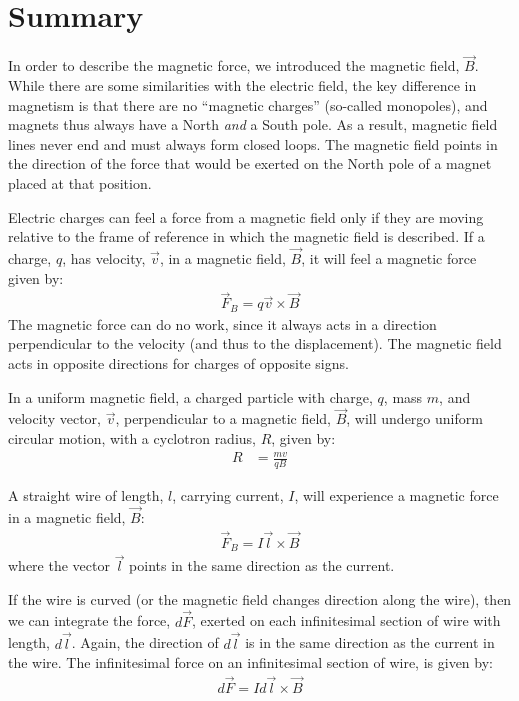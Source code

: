 \newpage
\section{Summary}
\begin{chapterSummary}
In order to describe the magnetic force, we introduced the magnetic field, $\vec B$. While there are some similarities with the electric field, the key difference in magnetism is that there are no ``magnetic charges'' (so-called monopoles), and magnets thus always have a North \textit{and} a South pole. As a result, magnetic field lines never end and must always form closed loops. The magnetic field points in the direction of the force that would be exerted on the North pole of a magnet placed at that position.

Electric charges can feel a force from a magnetic field only if they are moving relative to the frame of reference in which the magnetic field is described. If a charge, $q$, has velocity, $\vec v$, in a magnetic field, $\vec B$, it will feel a magnetic force given by:
\begin{align*}
\vec F_B =q \vec v \times \vec B
\end{align*}
The magnetic force can do no work, since it always acts in a direction perpendicular to the velocity (and thus to the displacement). The magnetic field acts in opposite directions for charges of opposite signs.

In a uniform magnetic field, a charged particle with charge, $q$, mass $m$, and velocity vector, $\vec v$, perpendicular to a magnetic field, $\vec B$, will undergo uniform circular motion, with a cyclotron radius, $R$, given by:
\begin{align*}
R &= \frac{mv}{qB}
\end{align*}

A straight wire of length, $l$, carrying current, $I$, will experience a magnetic force in a magnetic field, $\vec B$:
\begin{align*}
\vec F_B = I \vec l \times \vec B
\end{align*}
where the vector $\vec l$ points in the same direction as the current.

If the wire is curved (or the magnetic field changes direction along the wire), then we can integrate the force, $d\vec F$, exerted on each infinitesimal section of wire with length, $d\vec l$. Again, the direction of $d\vec l$ is in the same direction as the current in the wire. The infinitesimal force on an infinitesimal section of wire, is given by:
\begin{align*}
d\vec F = I d\vec l \times \vec B
\end{align*}


\end{chapterSummary}
